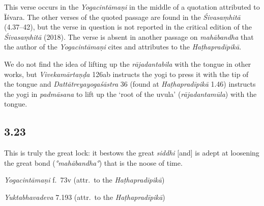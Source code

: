 \begin{ekdosis}
\begin{philcomm}[hp03_022]
This verse occurs in the \emph{Yogacintāmaṇi} in the middle of a quotation attributed to Īśvara. The other verses of the quoted passage are found in the \emph{Śivasaṃhitā} (4.37–42), but the verse in question is not reported in the critical edition of the \emph{Śivasaṃhitā} (2018). The verse is absent in another passage on \emph{mahābandha} that the author of the \emph{Yogacintāmaṇi} cites and attributes to the \emph{Haṭhapradīpikā}.

We do not find the idea of lifting up the \emph{rājadantabila} with the tongue in other works, but \emph{Vivekamārtaṇḍa} 126ab instructs the yogi to press it with the tip of the tongue and \emph{Dattātreyayogaśāstra} 36 (found at \emph{Haṭhapradīpikā} 1.46) instructs the yogi in \emph{padmāsana} to lift up the `root of the uvula' (\emph{rājadantamūla}) with the tongue.
\end{philcomm}

\subsection*{3.23}
\begin{translation}[hp03_023]
This is truly the great lock: it bestows the great \emph{siddhi} [and] is adept at loosening the great bond (\emph{°mahābandha°}) that is the noose of time.
\end{translation}


\begin{testimonia}[hp03_023]
\emph{Yogacintāmaṇi} f.~73v (attr.~to the \emph{Haṭhapradīpikā})
\begin{versinnote}
\end{versinnote}

\emph{Yuktabhavadeva} 7.193 (attr.~to the \emph{Haṭhapradīpikā})
\begin{versinnote}
\end{versinnote}
\end{testimonia}



\end{ekdosis}
